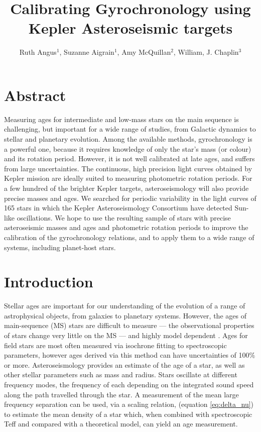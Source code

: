 \documentclass[12pt,preprint]{aastex}
\begin{document}
\title{Calibrating Gyrochronology using Kepler Asteroseismic targets}

\author{Ruth Angus$^1$, Suzanne Aigrain$^1$, Amy McQuillan$^2$, William, J. Chaplin$^3$}

\section{Abstract}
\label{abs}

Measuring ages for intermediate and low-mass stars on the main
sequence is challenging, but important for a wide range of studies,
from Galactic dynamics to stellar and planetary evolution. Among the
available methods, gyrochronology is a powerful one, because it
requires knowledge of only the star's mass (or colour) and its
rotation period. However, it is not well calibrated at late ages, and
suffers from large uncertainties. The continuous, high precision light
curves obtained by Kepler mission are ideally suited to measuring
photometric rotation periods. For a few hundred of the brighter Kepler
targets,  asteroseismology will also provide precise masses and
ages. We searched for periodic variability in the light curves of
165 stars in which the Kepler Asteroseismology Consortium have
detected Sun-like oscillations. We hope to use the resulting sample of
stars with precise asteroseismic masses and ages and photometric
rotation periods to improve the calibration of the gyrochronology
relations, and to apply them to a wide range of systems, including
planet-host stars.


\section{Introduction}
\label{intro}


Stellar ages are important for our understanding of the evolution of
a range of astrophysical objects, from galaxies to planetary
systems. However, the ages of main-sequence (MS) stars are difficult to measure --- the observational properties of stars change very little on the MS --- and
highly model dependent \citep{Soderblom_2010}. 
Ages for field stars are most often measured via isochrone fitting to spectroscopic parameters, however ages derived via this method can have uncertainties of 100\% or more. 
Asteroseismology provides an estimate of the age of a star, as well as other stellar parameters such as mass and radius. 
Stars oscillate at different frequency modes, the frequency of each depending on the integrated sound speed along the path travelled through the star. 
A measurement of the mean large frequency separation can be used, via a scaling relation, (equation \ref{eq:delta_nu}) to estimate the mean density of a star which, when combined with spectroscopic Teff and compared with a theoretical model, can yield an age measurement. 
\end{document}
